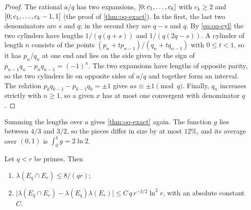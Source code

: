 \begin{proof}
The rational $a/q$ has two expansions, $[0; c_1, \dots, c_k]$ with $c_k \ge 2$ and $[0; c_1, \dots, c_k - 1, 1]$ (the proof of \cref{thm:oq-exact}). In the first, the last two denominators are $s$ and $q$; in the second they are $q - s$ and $q$. By \eqref{eq:oq-cyl} the two cylinders have lengths $1/(q(q+s))$ and $1/(q(2q-s))$. A cylinder of length $n$ consists of the points $(p_n + tp_{n-1})/(q_n + tq_{n-1})$ with $0 \le t < 1$, so it has $p_n/q_n$ at one end and lies on the side given by the sign of $p_{n-1}q_n - p_nq_{n-1} = (-1)^n$. The two expansions have lengths of opposite parity, so the two cylinders lie on opposite sides of $a/q$ and together form an interval. The relation $p_kq_{k-1} - p_{k-1}q_k = \pm 1$ gives $as \equiv \pm 1 \pmod q$. Finally, $q_n$ increases strictly with $n \ge 1$, so a given $x$ has at most one convergent with denominator $q$.
\end{proof}

Summing the lengths over $a$ gives \cref{thm:oq-exact} again. The function $g$ lies between $4/3$ and $3/2$, so the pieces differ in size by at most $12\%$, and its average over $(0,1)$ is $\int_0^1 g = 2\ln 2$.

\begin{lemma}[overlaps]\label{lem:ob-overlap}
Let $q < r$ be primes. Then
\begin{enumerate}[label=(\roman*)]
\item $\lambda(E_q \cap E_r) \le 8/(qr)$;
\item $\bigl|\lambda(E_q \cap E_r) - \lambda(E_q)\lambda(E_r)\bigr| \le C\,q\,r^{-3/2}\ln^2 r$, with an absolute constant $C$.
\end{enumerate}
\end{lemma}

